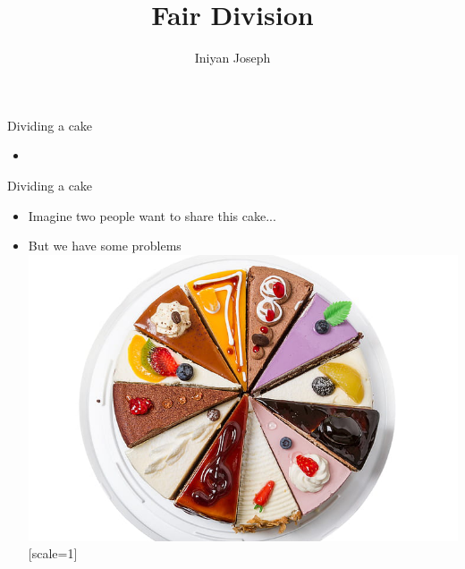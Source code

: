 \documentclass[t]{beamer}
\title{Fair Division}
\author{Iniyan Joseph}
\date{ }
\begin{document}
\begin{frame}
	\titlepage
\end{frame}

\begin{frame}{Dividing a cake}
	\begin{itemize}
		\item[\ding{118}] 
	\end{itemize}
\end{frame}

\begin{frame}{Dividing a cake}
	\begin{itemize}
		\item[\ding{118}] Imagine two people want to share this cake...
		\item[\ding{118}] But we have some problems
		\includegraphics{cakeImage}[scale=1]
	\end{itemize}
\end{frame}
\end{document}
